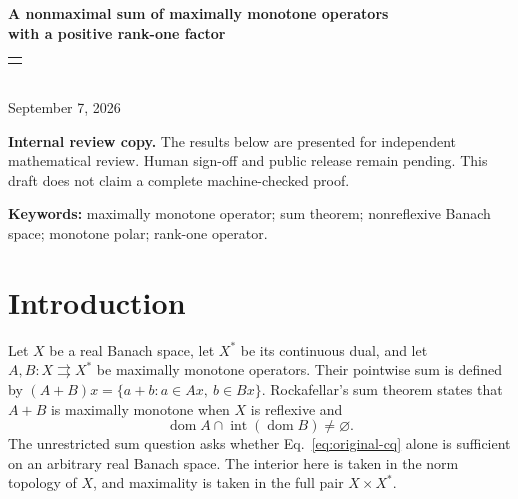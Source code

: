 \documentclass[11pt]{article}
\author{Weifeng Yang\\
\texttt{ywf841673182@gmail.com}
}
\makeatletter
\newcommand{\dom}{\operatorname{dom}}
\newcommand{\preservedAuthor}{\begin{tabular}{c}\@author\end{tabular}}
\makeatother
\begin{document}
\begin{center}
{\Large\bfseries A nonmaximal sum of maximally monotone operators\\[4pt]
with a positive rank-one factor}\\[10pt]
\preservedAuthor\\[10pt]
September 7, 2026
\end{center}

\noindent\textbf{Internal review copy.}
The results below are presented for independent mathematical review.
Human sign-off and public release remain pending. This draft does not claim
a complete machine-checked proof.

\begin{abstract}
We construct two maximally monotone operators on a real Banach space
whose domains satisfy Rockafellar's interior-domain condition and whose
sum is not maximally monotone. The second operator is bounded, linear,
positive, rank one, and defined on the whole space. We first construct
the operators on $c_0$ and then realize the same conclusion on standard
$\ell^1$ with its full dual $\ell^\infty$. The construction uses countably
many copies of a classical triangular operator and constrains their sums
by a Lipschitz curve. Every parameter in this curve has a finitely
supported tail, and its limiting tail belongs to $\ell^2\setminus\ell^1$.
We prove maximality by reducing every point of the monotone polar to a
scalar inequality and excluding the missing parameter interval through
this failure of summability. The first operator omits zero and satisfies
a uniform lower bound on the pairing divided by the primal norm.
The positive rank-one perturbation makes the pairing strictly positive
on every point of the sum graph, so that $(0,0)$ gives a proper monotone
extension. We also compute a positive Fitzpatrick split value at this point.
\end{abstract}

\noindent\textbf{Keywords:} maximally monotone operator; sum theorem;
nonreflexive Banach space; monotone polar; rank-one operator.

\section{Introduction}
\label{sec:introduction}
Let $X$ be a real Banach space, let $X^*$ be its continuous dual, and let
$A,B:X\rightrightarrows X^*$ be maximally monotone operators. Their pointwise
sum is defined by $(A+B)x=\{a+b:a\in Ax,\ b\in Bx\}$. Rockafellar's sum
theorem \cite{rockafellar1970} states that $A+B$ is maximally monotone when
$X$ is reflexive and
\begin{equation}
\dom A\cap\operatorname{int}(\dom B)\ne\varnothing.
\label{eq:original-cq}
\end{equation}
The unrestricted sum question asks whether Eq.~\eqref{eq:original-cq}
alone is sufficient on an arbitrary real Banach space. The interior here
is taken in the norm topology of $X$, and maximality is taken in the full
pair $X\times X^*$.
\end{document}
